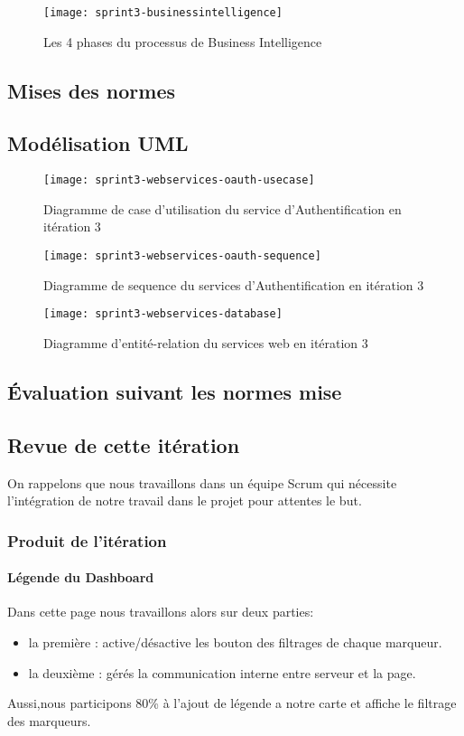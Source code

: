 \begin{figure}[htbp]
  \centering
  \texttt{[image: sprint3-businessintelligence]}
  \caption{Les 4 phases du processus de Business Intelligence}
  \label{fig:sprint3-businessintelligence}
\end{figure}


\subsection{Mises des normes}

\subsection{Modélisation UML}

\begin{figure}[htbp]
    \centering
    \texttt{[image: sprint3-webservices-oauth-usecase]}
    \caption{Diagramme de case d'utilisation du service d'Authentification en itération 3}
\end{figure}

\begin{figure}[htbp]
    \centering
    \texttt{[image: sprint3-webservices-oauth-sequence]}
    \caption{Diagramme de sequence du services d'Authentification en itération 3}
\end{figure}

\begin{figure}[htbp]
    \centering
    \texttt{[image: sprint3-webservices-database]}
    \caption{Diagramme d'entité-relation du services web en itération 3}
\end{figure}

\subsection{Évaluation suivant les normes mise}
\clearpage
\subsection{Revue de cette itération}
On rappelons que nous travaillons dans un équipe Scrum qui nécessite
l'intégration de notre travail dans le projet pour attentes le but.
\subsubsection{Produit de l'itération}
\paragraph{Légende du Dashboard}
Dans cette page nous travaillons alors sur deux parties:
\begin{itemize}
 \item la première : active/désactive les bouton des filtrages de chaque marqueur.
 \item la deuxième : gérés la communication interne entre serveur et la page.
 \end{itemize}
Aussi,nous participons 80\% à l'ajout de légende a notre carte
et affiche le filtrage des marqueurs.\\

